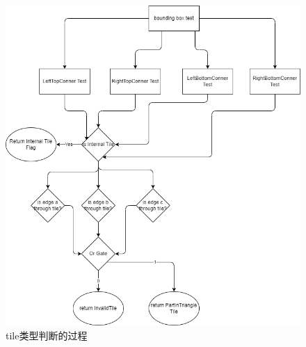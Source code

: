 {    \begin{figure}[H]
        \centering
        \includegraphics[width=.9\textwidth]{figure/tilechekflow.png}
        \caption{\label{fig:tile check topo flow}tile类型判断的过程}
    \end{figure}


}
